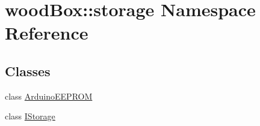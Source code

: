 \hypertarget{namespacewood_box_1_1storage}{}\section{wood\+Box\+:\+:storage Namespace Reference}
\label{namespacewood_box_1_1storage}
\subsection*{Classes}
\begin{DoxyCompactItemize}
\item 
class \mbox{\hyperlink{classwood_box_1_1storage_1_1_arduino_e_e_p_r_o_m}{Arduino\+E\+E\+P\+R\+OM}}
\item 
class \mbox{\hyperlink{classwood_box_1_1storage_1_1_i_storage}{I\+Storage}}
\end{DoxyCompactItemize}
